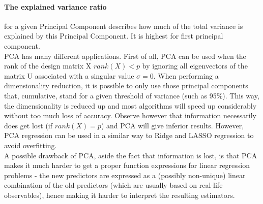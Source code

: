 \documentclass[11pt,a4paper,notitlepage]{article}
\begin{document}
\paragraph*{The explained variance ratio}for a given Principal Component describes how much of the total variance is explained by this Principal Component. It is highest for first principal component. \\

PCA has many different applications. First of all, PCA can be used when the rank of the design matrix X $rank(X)<p$ by ignoring all eigenvectors of the matrix U associated with a singular value $\sigma=0$. When performing a dimensionality reduction, it is possible to only use those principal components that, cumulative, stand for a given threshold of variance (such as 95\%).  This way, the dimensionality is reduced up and most algorithms will speed up considerably without too much loss of accuracy. Observe however that information necessarily does get lost (if $rank(X)=p$) and PCA will give inferior results. However, PCA regression can be used in a similar way to Ridge and LASSO regression \citep{hastie} to avoid overfitting.  \\

A possible drawback of PCA, aside the fact that information is lost, is that PCA makes it much harder to get a proper function expressions for linear regression problems - the new predictors are expressed as a (possibly non-unique) linear combination of the old predictors (which are usually based on real-life observables), hence making it harder to interpret the resulting estimators.
\end{document}
